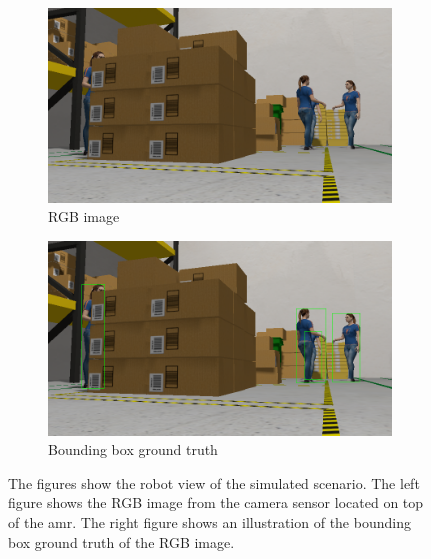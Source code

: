 \begin{figure}
    \centering
    \begin{subfigure}[h]{0.45\linewidth}
        \centering
        \includegraphics[width=\linewidth]{figures/sim/rgb_img.png}
        \caption{RGB image}
        \label{fig:robot_view_scenario:rgb_image}
    \end{subfigure}
    \begin{subfigure}[h]{0.45\linewidth}
        \centering
        \includegraphics[width=\linewidth]{figures/sim/bbgt.png}
        \caption{Bounding box ground truth}
        \label{fig:robot_view_scenario:bbgt}
    \end{subfigure}
    \caption[Robot view of the simulated scenario]{The figures show the robot view of the simulated scenario. The left figure shows the RGB image from the camera sensor located on top of the \gls{amr}. The right figure shows an illustration of the bounding box ground truth of the RGB image.}
    \label{fig:robot_view_scenario}
\end{figure}

